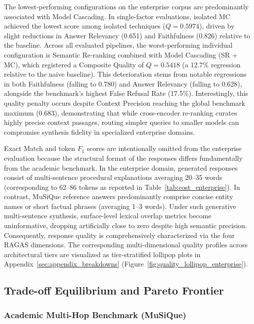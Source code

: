 

The lowest-performing configurations on the enterprise corpus are predominantly associated with Model Cascading. In single-factor evaluations, isolated MC achieved the lowest score among isolated techniques ($Q = 0.5974$), driven by slight reductions in Answer Relevancy (0.651) and Faithfulness (0.826) relative to the baseline. Across all evaluated pipelines, the worst-performing individual configuration is Semantic Re-ranking combined with Model Cascading (SR + MC), which registered a Composite Quality of $Q = 0.5418$ (a 12.7\% regression relative to the naive baseline). This deterioration stems from notable regressions in both Faithfulness (falling to 0.780) and Answer Relevancy (falling to 0.628), alongside the benchmark's highest False Refusal Rate (17.5\%). Interestingly, this quality penalty occurs despite Context Precision reaching the global benchmark maximum (0.683), demonstrating that while cross-encoder re-ranking curates highly precise context passages, routing simpler queries to smaller models can compromise synthesis fidelity in specialized enterprise domains.

Exact Match and token $F_1$ scores are intentionally omitted from the enterprise evaluation because the structural format of the responses differs fundamentally from the academic benchmark. In the enterprise domain, generated responses consist of multi-sentence procedural explanations averaging 20--35 words (corresponding to 62--86 tokens as reported in Table~\ref{tab:cost_enterprise}). In contrast, MuSiQue reference answers predominantly comprise concise entity names or short factual phrases (averaging 1--3 words). Under such generative multi-sentence synthesis, surface-level lexical overlap metrics become uninformative, dropping artificially close to zero despite high semantic precision. Consequently, response quality is comprehensively characterized via the four RAGAS dimensions. The corresponding multi-dimensional quality profiles across architectural tiers are visualized as tier-stratified lollipop plots in Appendix~\ref{sec:appendix_breakdowns} (Figure~\ref{fig:quality_lollipop_enterprise}).

\FloatBarrier
\subsection{Trade-off Equilibrium and Pareto Frontier}
\label{subsec:results_pareto}

\subsubsection{Academic Multi-Hop Benchmark (MuSiQue)}
\label{subsubsec:pareto_musique}

